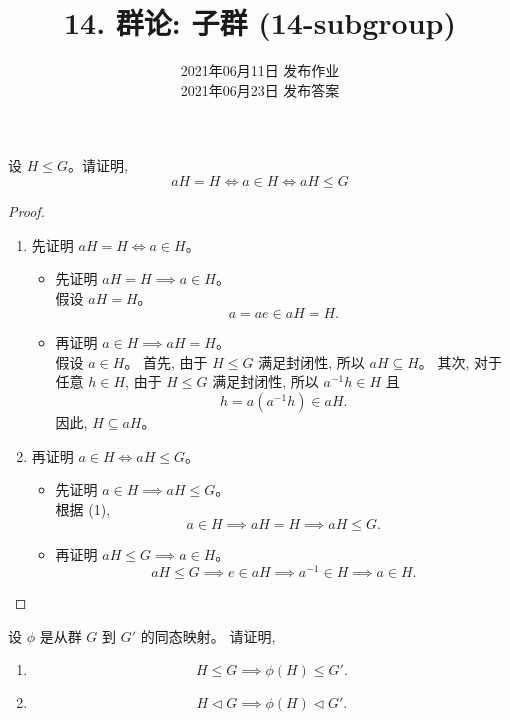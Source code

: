 \documentclass[a4paper, justified]{tufte-handout}
\title{14. 群论: 子群 (14-subgroup)}
\date{2021年06月11日 发布作业 \\ 2021年06月23日 发布答案}
\begin{document}
\maketitle
\noplagiarism %
\begin{abstract}
\end{abstract}
\beginrequired

\begin{problem}
  设 $H \le G$。请证明,
  \[
    aH = H \iff a \in H \iff aH \le G
  \]
\end{problem}

\begin{proof}
  \begin{enumerate}[(1)]
    \item 先证明 $aH = H \iff a \in H$。
      \begin{itemize}
        \item 先证明 $aH = H \implies a \in H$。\\
          假设 $aH = H$。
          \[
            a = ae \in aH = H.
          \]
        \item 再证明 $a \in H \implies aH = H$。\\
          假设 $a \in H$。
          首先, 由于 $H \le G$ 满足封闭性, 所以 $aH \subseteq H$。
          其次, 对于任意 $h \in H$, 由于 $H \le G$ 满足封闭性,
          所以 $a^{-1}h \in H$ 且
          \[
            h = a (a^{-1}h) \in aH.
          \]
          因此, $H \subseteq aH$。
      \end{itemize}
    \item 再证明 $a \in H \iff aH \le G$。\\
      \begin{itemize}
        \item 先证明 $a \in H \implies aH \le G$。\\
          根据 (1),
          \[
            a \in H \implies aH = H \implies aH \le G.
          \]
        \item 再证明 $aH \le G \implies a \in H$。
          \[
            aH \le G \implies e \in aH \implies a^{-1} \in H \implies a \in H.
          \]
      \end{itemize}
  \end{enumerate}
\end{proof}

\begin{problem}[\score{5 = 2 + 3} $\star\star\star$]
  设 $\phi$ 是从群 $G$ 到 $G'$ 的同态映射。
  请证明,
  \begin{enumerate}[(1)]
    \item
      \[
        H \le G \implies \phi(H) \le G'.
      \]
    \item
      \[
        H \triangleleft G \implies \phi(H) \triangleleft G'.
      \]
  \end{enumerate}
\end{problem}
\end{document}
